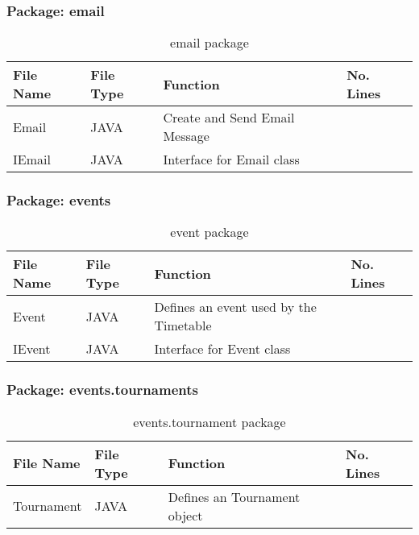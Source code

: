 \subsubsection{Package: email}
\begin{table}[H]
\begin{center}
    \begin{tabular}{| l | l | l| p{1cm} |}
    \hline
    File Name & File Type & Function & No. Lines\\ \hline
    Email & JAVA & Create and Send Email Message\\ \hline
	IEmail & JAVA & Interface for Email class\\ \hline	
    \end{tabular}
\end{center}
\caption{email package}
\end{table}

\subsubsection{Package: events}
\begin{table}[H]
\begin{center}
     \begin{tabular}{| l | l | l| p{1cm} |}
    \hline
    File Name & File Type & Function & No. Lines\\ \hline
    Event & JAVA & Defines an event used by the Timetable\\ \hline
	IEvent & JAVA & Interface for Event class\\ \hline	
    \end{tabular}
\end{center}
\caption{event package}
\end{table}

\subsubsection{Package: events.tournaments}
\begin{table}[H]
\begin{center}
    \begin{tabular}{| l | l | l| p{1cm} |}
    \hline
    File Name & File Type & Function & No. Lines\\ \hline
    Tournament & JAVA & Defines an Tournament object\\ \hline
    \end{tabular}
\end{center}
\caption{events.tournament package}
\end{table}

